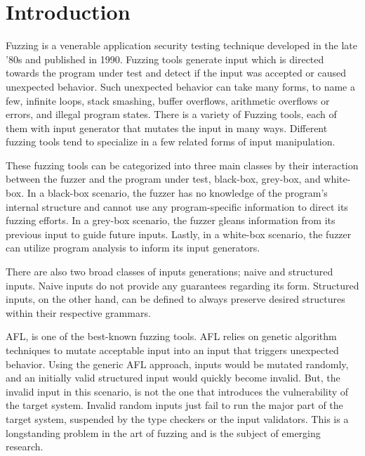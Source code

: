\documentclass[12pt]{diazessay}
\begin{document}
\section*{Introduction}

Fuzzing is a venerable application security testing technique developed in the late '80s\cite{Barton1988} and published in 1990\cite{Miller1990}.
Fuzzing tools generate input which is directed towards the program under test and detect if the input was accepted or caused unexpected behavior.
Such unexpected behavior can take many forms, to name a few, infinite loops, stack smashing, buffer overflows, arithmetic overflows or errors, and illegal program states.
There is a variety of Fuzzing tools\cite{ModelBasedFuzzing}\cite{GrammarBasedFuzzing}\cite{ProtocolBasedFuzzing}, each of them with input generator that mutates the input in many ways.
Different fuzzing tools tend to specialize in a few related forms of input\cite{InputDiversity} manipulation.

These fuzzing tools can be categorized into three main classes by their interaction between the fuzzer and the program under test, black-box\cite{takanen2018fuzzing}, grey-box, and white-box\cite{fuzzingsurvey}.
In a black-box scenario, the fuzzer has no knowledge of the program's internal structure and cannot use any program-specific information to direct its fuzzing efforts.
In a grey-box scenario, the fuzzer gleans information from its previous input to guide future inputs.
Lastly, in a white-box scenario, the fuzzer can utilize program analysis to inform its input generators.

There are also two broad classes of inputs generations; naive and structured\cite{fuzzingsurvey} inputs.
Naive inputs do not provide any guarantees regarding its form.
Structured inputs, on the other hand, can be defined to always preserve desired structures within their respective grammars.

AFL\cite{AFL_page}, is one of the best-known fuzzing tools. AFL relies on genetic algorithm techniques\cite{InputMutationAlgorithm} to mutate acceptable input into an input that triggers unexpected behavior.
Using the generic AFL approach, inputs would be mutated randomly, and an initially valid structured input would quickly become invalid.
But, the invalid input in this scenario, is not the one that introduces the vulnerability of the target system.
Invalid random inputs just fail to run the major part of the target system, suspended by the type checkers or the input validators.
This is a longstanding problem in the art of fuzzing and is the subject of emerging research.
\end{document}
